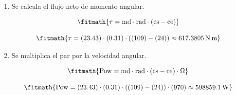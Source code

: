 \begin{enumerate}

\item Se calcula el flujo neto de momento angular.

\[\fitmath{\tau=\mathrm{md}\cdot \mathrm{rad}\cdot \left(\mathrm{cs}-\mathrm{ce}\right)}\]

\[\fitmath{\tau=(23.43)\cdot (0.31)\cdot \left((109)-(24)\right)\approx 617.3805\,\mathrm{N\,m}}\]

\item Se multiplica el par por la velocidad angular.

\[\fitmath{\mathrm{Pow}=\mathrm{md}\cdot \mathrm{rad}\cdot \left(\mathrm{cs}-\mathrm{ce}\right)\cdot \Omega}\]

\[\fitmath{\mathrm{Pow}=(23.43)\cdot (0.31)\cdot \left((109)-(24)\right)\cdot (970)\approx 598859.1\,\mathrm{W}}\]

\end{enumerate}
